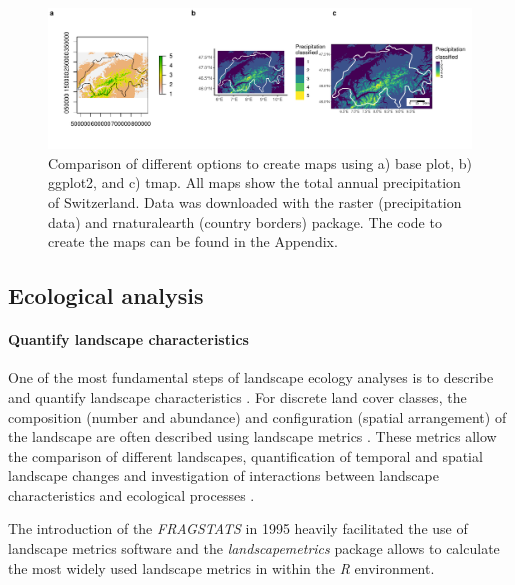 \documentclass[smallextended]{svjour3}       %
\begin{document}
\begin{figure}
\includegraphics[width=1\linewidth,height=0.5\textheight]{data/plot_all} \caption{Comparison of different options to create maps using a) base plot, b) ggplot2, and c) tmap. All maps show the total annual precipitation of Switzerland. Data was downloaded with the raster (precipitation data) and rnaturalearth (country borders) package. The code to create the maps can be found in the Appendix.}\label{fig:fig-map}
\end{figure}

\hypertarget{sec:ecological_analysis}{%
\subsection{Ecological analysis}\label{sec:ecological_analysis}}

\hypertarget{sec:landscape_metrics}{%
\paragraph{Quantify landscape characteristics}\label{sec:landscape_metrics}}

One of the most fundamental steps of landscape ecology analyses is to describe and quantify landscape characteristics \cite{Turner2005,Lausch2015}.
For discrete land cover classes, the composition (number and abundance) and configuration (spatial arrangement) of the landscape are often described using landscape metrics \cite{Gustafson1998,Uuemaa2009,Uuemaa2013,Gustafson2019}.
These metrics allow the comparison of different landscapes, quantification of temporal and spatial landscape changes and investigation of interactions between landscape characteristics and ecological processes \cite{Uuemaa2009}.

The introduction of the \emph{FRAGSTATS} in 1995 heavily facilitated the use of landscape metrics software \cite{McGarigal2012,Kupfer2012,Gustafson2019} and the \emph{landscapemetrics} package \cite{Hesselbarth2019a} allows to calculate the most widely used landscape metrics in within the \emph{R} environment.
\end{document}
